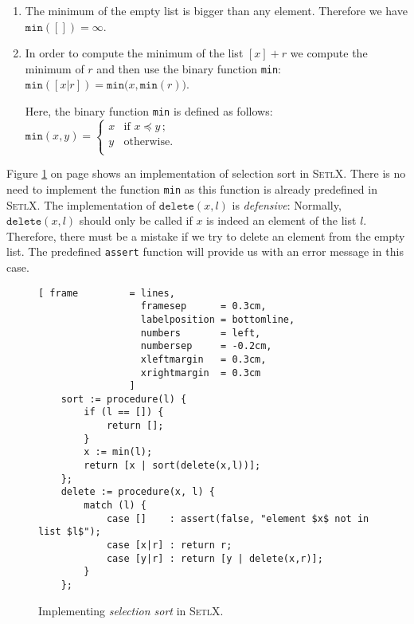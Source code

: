 \begin{enumerate}
\item The minimum of the empty list is bigger than any element.  Therefore we have 
      \\[0.2cm]
      \hspace*{1.3cm} $\mathtt{min}([]) = \infty$.
\item In order to compute the minimum of the list $[x] + r$ we compute the minimum of $r$ and
      then use the binary function \texttt{min}: \\[0.2cm]
      \hspace*{1.3cm} 
      $\mathtt{min}([x | r]) = \mathtt{min}\bigl(x, \mathtt{min}(r) \bigr)$. 

      Here, the binary function \texttt{min} is defined as follows: \\[0.2cm]
      \hspace*{1.3cm} 
      $\mathtt{min}(x,y) = \left\{
      \begin{array}{ll}
        x  & \mbox{if $x \preceq y\,$;} \\
        y  & \mbox{otherwise.} \\
      \end{array}\right.
      $
\end{enumerate}
Figure \ref{fig:selection-sort.setlx} on page \pageref{fig:selection-sort.setlx} shows an
implementation of selection sort in \textsc{SetlX}.  There is no need to implement the function
\texttt{min} as this function is already predefined in \textsc{SetlX}. 
The implementation of $\mathtt{delete}(x,l)$ is \emph{defensive}:  Normally, $\mathtt{delete}(x, l)$
should only be called if $x$ is indeed an element of the list $l$.   Therefore, there must be
a mistake if we try to delete an element from the empty list.  The predefined \texttt{assert}
function will provide us with an error message in this case.


\begin{figure}[!ht]
  \centering
\begin{Verbatim}[ frame         = lines, 
                  framesep      = 0.3cm, 
                  labelposition = bottomline,
                  numbers       = left,
                  numbersep     = -0.2cm,
                  xleftmargin   = 0.3cm,
                  xrightmargin  = 0.3cm
                ]
    sort := procedure(l) {
        if (l == []) {
            return [];
        }
        x := min(l);
        return [x | sort(delete(x,l))];
    };
    delete := procedure(x, l) {
        match (l) {
            case []    : assert(false, "element $x$ not in list $l$");
            case [x|r] : return r;
            case [y|r] : return [y | delete(x,r)];
        }
    };
\end{Verbatim}
\vspace*{-0.3cm}
  \caption{Implementing \emph{selection sort} in \textsc{SetlX}.}
  \label{fig:selection-sort.setlx}
\end{figure}

